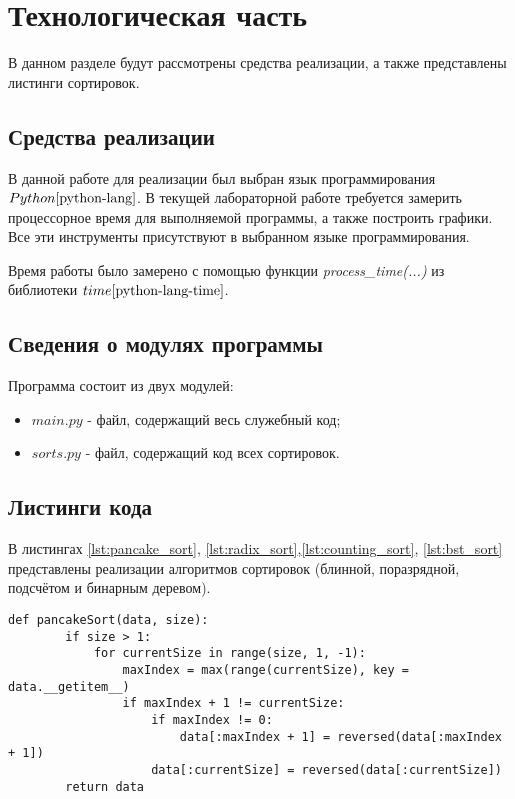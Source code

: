 \chapter{Технологическая часть}

В данном разделе будут рассмотрены средства реализации, а также представлены листинги сортировок.

\section{Средства реализации}
В данной работе для реализации был выбран язык программирования $Python \cite{python-lang}$. В текущей лабораторной работе требуется замерить процессорное время для выполняемой программы, а также построить графики. Все эти инструменты присутствуют в выбранном языке программирования.

Время работы было замерено с помощью функции \textit{process\_time(...)} из библиотеки $time \cite{python-lang-time}$.

\section{Сведения о модулях программы}
Программа состоит из двух модулей:
\begin{itemize}
	\item $main.py$ - файл, содержащий весь служебный код;
    \item $sorts.py$ - файл, содержащий код всех сортировок. \newline
\end{itemize}


\section{Листинги кода}

В листингах \ref{lst:pancake_sort}, \ref{lst:radix_sort},\ref{lst:counting_sort}, \ref{lst:bst_sort} представлены реализации алгоритмов сортировок (блинной, поразрядной, подсчётом и бинарным деревом). \clearpage

\begin{center}
    \captionsetup{justification=raggedright,singlelinecheck=off}
    \begin{lstlisting}[label=lst:pancake_sort,caption=Алгоритм блинной сортировки]
	def pancakeSort(data, size):
		if size > 1:
			for currentSize in range(size, 1, -1):
				maxIndex = max(range(currentSize), key = data.__getitem__)
				if maxIndex + 1 != currentSize:
					if maxIndex != 0:
						data[:maxIndex + 1] = reversed(data[:maxIndex + 1])
					data[:currentSize] = reversed(data[:currentSize])
		return data
	\end{lstlisting}
\end{center}

